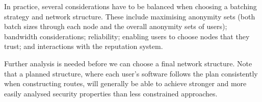\documentclass{llncs}
\begin{document}

In practice, several considerations have to be balanced when choosing
a batching strategy and network structure. These include maximising
anonymity sets (both batch sizes through each node and the overall
anonymity sets of users); bandwidth considerations; reliability;
enabling users to choose nodes that they trust; and interactions with
the reputation system.

Further analysis is needed before we can choose a
final network structure. Note that a planned structure, where each
user's software follows the plan consistently when constructing
routes, will generally be able to achieve stronger and more easily
analysed security properties than less constrained approaches.


\end{document}

